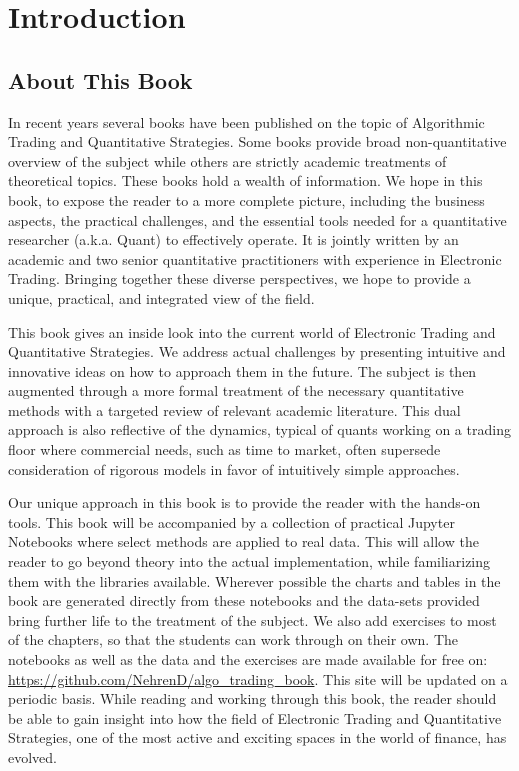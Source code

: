 \chapter{Introduction\label{chap:ch_intro}}
\section{About This Book}

In recent years several books have been published  on the topic of Algorithmic Trading and Quantitative Strategies. Some books provide broad non-quantitative overview of the subject while others are strictly academic treatments of theoretical topics. These books hold a wealth of  information. We hope in this book, to expose the reader to a more complete picture, including the business aspects, the practical challenges, and the essential tools needed for a quantitative researcher (a.k.a. Quant) to effectively operate. It is jointly written by an academic and two senior quantitative practitioners with experience in Electronic Trading. Bringing together these diverse perspectives, we hope to provide a unique, practical, and integrated view of the field.


This book gives an inside look into the current world of Electronic Trading and Quantitative Strategies. We address actual challenges by presenting intuitive and innovative ideas on how to approach them in the future. The subject is then augmented through a more formal treatment of the necessary quantitative methods with a targeted review of relevant academic literature. This dual approach is also reflective of the dynamics, typical of quants working on a trading floor where commercial needs, such as time to market, often supersede consideration of rigorous models in favor of intuitively simple approaches. 


Our unique approach in this book is to provide the reader with the hands-on tools. This book will be accompanied by a collection of practical Jupyter Notebooks where select methods are applied to real data. This will allow the reader to go beyond theory into the actual implementation, while familiarizing them with the libraries available. Wherever possible the charts and tables in the book are generated directly from these notebooks and the data-sets provided bring further life to the treatment of the subject. We also add exercises to most of the chapters, so that the students can work through on their own. The notebooks as well as the data and the exercises are made  available for free on: \url{https://github.com/NehrenD/algo_trading_book}. This site will be updated on a periodic basis. While reading and working through this book, the reader should be able to gain insight into how the field of Electronic Trading and Quantitative Strategies, one of the most active and exciting spaces in the world of finance, has evolved.



